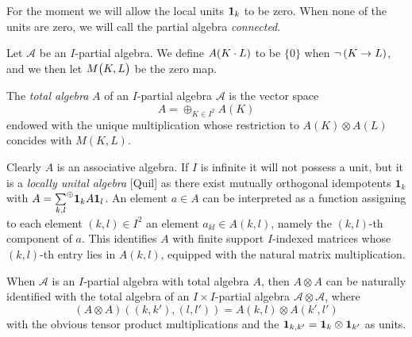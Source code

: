 \begin{Rem} For the moment we will allow the local units $\mathbf{1}_k$ to be zero. When none of the units are zero, we will call the partial algebra \emph{connected}. 
\end{Rem}

Let $\mathscr{A}$ be an $I$-partial algebra. We define $A(K\cdot L)$ to be $\{0\}$ when $\neg \left(K\rightarrow L\right)$, and we then let $M{\begin{pmatrix} K, L\end{pmatrix}}$ be the zero map.

\begin{Def} The \emph{total algebra} $A$ of an $I$-partial algebra $\mathscr{A}$ is the vector space \[A = \oplus_{K\in I^2} A(K)\] endowed with the unique multiplication whose restriction to $A(K)\otimes A(L)$ concides with $M(K,L)$.  
\end{Def} 

Clearly $A$ is an associative algebra. If $I$ is infinite it will not possess a unit, but it is a \emph{locally unital algebra} [Quil] as there exist mutually orthogonal idempotents $\mathbf{1}_k$ with $A = \underset{k,l}{\sum}^{\oplus} \mathbf{1}_kA\mathbf{1}_l$. An element $a\in A$ can be interpreted as a function assigning to each element $(k,l)\in I^2$ an element $a_{kl}\in A(k,l)$, namely the $(k,l)$-th component of $a$. This identifies $A$ with finite support $I$-indexed matrices whose $(k,l)$-th entry lies in $A(k,l)$, equipped with the natural matrix multiplication. 

\begin{Rem}\label{RemGrad} When $\mathscr{A}$ is an $I$-partial algebra with total algebra $A$, then $A\otimes A$ can be naturally identified with the total algebra of an $I\times I$-partial algebra $\mathscr{A}\otimes \mathscr{A}$, where \[(A\otimes A)((k,k'),(l,l')) = A(k,l)\otimes A(k',l')\] with the obvious tensor product multiplications and the $\mathbf{1}_{k,k'} = \mathbf{1}_k\otimes \mathbf{1}_{k'}$ as units. 
\end{Rem} 


